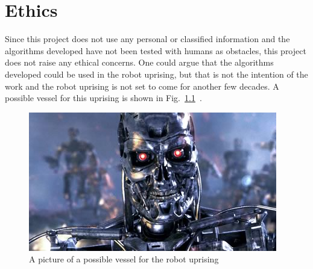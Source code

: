 


\chapter{Ethics}

\label{chapter:ethics}

Since this project does not use any personal or classified information and the
algorithms developed have not been tested with humans as obstacles, this
project does not raise any ethical concerns. One could argue that the
algorithms developed could be used in the robot uprising, but that is not the
intention of the work and the robot uprising is not set to come for another few
decades. A possible vessel for this uprising is shown in
Fig.~\ref{fig:skynet}~\cite{skynet}.

\begin{figure}[h!]

    \centering

    \includegraphics[width=0.8\linewidth]{figs/skynet}

    \caption{A picture of a possible vessel for the robot uprising}

    \label{fig:skynet}

\end{figure}


